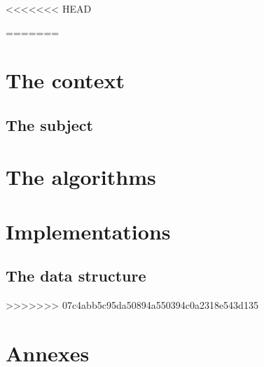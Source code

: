 \documentclass[12pt]{report}
\begin{document}


%



\begin{abstract}

\end{abstract}

\tableofcontents
\listoffigures





<<<<<<< HEAD

=======
\part{The context}
\chapter{The subject}

\part{The algorithms}




\part{Implementations}
\chapter{The data structure}

>>>>>>> 07c4abb5c95da50894a550394c0a2318e543d135





\part{Annexes}
\appendix

\end{document}
